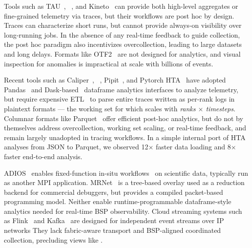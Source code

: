 Tools such as TAU~\cite{Shend2006:TAU}, \scorep{}~\cite{Knupf2012:Score-P}, and
Kineto~\cite{2025:PytorchKineto} can provide both high-level aggregates or fine-grained telemetry
via traces, but their workflows are post hoc by design.
Traces can characterize short runs, but cannot provide always-on visibility over long-running jobs.
In the absence of any real-time feedback to guide collection, the post hoc paradigm also
incentivizes overcollection, leading to large datasets and long delays.
Formats like OTF2~\cite{Eschw2012:OTF2} are not designed for analytics, and visual inspection for
anomalies is impractical at scale with billions of events.

Recent tools such as Caliper~\cite{Boehm2016:Caliper},
\dftracer{}~\cite{Devar2024:DFTracer}, Pipit~\cite{Bhate2024:Pipit}, and Pytorch
HTA~\cite{2025:MetaHTA} have adopted Pandas~\cite{:Pandas} and Dask-based~\cite{Rockl2015:Dask}
dataframe analytics interfaces to analyze telemetry, but require expensive
ETL~\cite{Yildi2023:IOMax} to parse entire traces written as per-rank logs in 
plaintext formats
--- the working set for which scales with \emph{ranks $\times$ timesteps}.
Columnar formats like Parquet~\cite{:ApacheParquet} offer efficient post-hoc analytics, but do not
by themselves address overcollection, working set scaling, or real-time feedback, and remain
largely unadopted in tracing workflows.
In a simple internal port of HTA analyses from JSON to Parquet, we observed 12$\times$ faster data loading
and 8$\times$ faster end-to-end analysis.

ADIOS~\cite{Godoy2020:ADIOS2} enables fixed-function in-situ
workflows~\cite{Eisen2025:ADIOS} on scientific data, typically run as another MPI application.
MRNet~\cite{Roth2003:MRNet,Willi2016:MRNetApps} is a tree-based overlay used as a reduction backend
for commercial debuggers, but provides a compiled packet-based programming model.
Neither enable runtime-programmable dataframe-style analytics needed for real-time BSP
observability.
Cloud streaming systems such as Flink~\cite{Carbo2015:ApacheFlink} and Kafka~\cite{Kreps2011:Kafka}
are designed for independent event streams over IP networks
They lack fabric-aware transport and BSP-aligned coordinated collection,
precluding views like .

